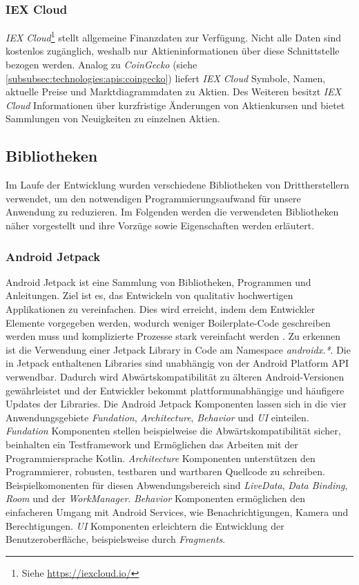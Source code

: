\documentclass[a4paper]{article}
\begin{document}
\subsubsection{IEX Cloud}
\label{subsubsec:technologies:apis:iex}
\textit{IEX Cloud}\footnote{Siehe \url{https://iexcloud.io/}} stellt allgemeine Finanzdaten zur Verfügung.
Nicht alle Daten sind kostenlos zugänglich, weshalb nur Aktieninformationen über diese Schnittstelle bezogen werden.
Analog zu \textit{CoinGecko} (siehe \autoref{subsubsec:technologies:apis:coingecko}) liefert \textit{IEX Cloud} Symbole, Namen, aktuelle Preise und Marktdiagrammdaten zu Aktien.
Des Weiteren besitzt \textit{IEX Cloud} Informationen über kurzfristige Änderungen von Aktienkursen und bietet Sammlungen von Neuigkeiten zu einzelnen Aktien.


\subsection{Bibliotheken}
\label{subsec:technologies:bibs}
Im Laufe der Entwicklung wurden verschiedene Bibliotheken von Drittherstellern verwendet, um den notwendigen Programmierungsaufwand für unsere Anwendung zu reduzieren.
Im Folgenden werden die verwendeten Bibliotheken näher vorgestellt und ihre Vorzüge sowie Eigenschaften werden erläutert.


\subsubsection{Android Jetpack}
\label{subsubsec:technologies:bibs:jetpack}
Android Jetpack ist eine Sammlung von Bibliotheken, Programmen und Anleitungen. Ziel ist es, das Entwickeln von qualitativ hochwertigen Applikationen zu vereinfachen. Dies wird erreicht, indem dem Entwickler Elemente vorgegeben werden, wodurch weniger Boilerplate-Code geschreiben werden muss und komplizierte Prozesse stark vereinfacht werden \cite{android_jetpack}. Zu erkennen ist die Verwendung einer Jetpack Library in Code am Namespace \textit{androidx.*}. Die in Jetpack enthaltenen Libraries sind unabhängig von der Android Platform API verwendbar. Dadurch wird Abwärtskompatibilität zu älteren Android-Versionen gewährleistet und der Entwickler bekommt plattformunabhängige und häufigere Updates der Libraries. Die Android Jetpack Komponenten lassen sich in die vier Anwendungsgebiete \textit{Fundation}, \textit{Architecture}, \textit{Behavior} und \textit{UI} einteilen. \textit{Fundation} Komponenten stellen beispielweise die Abwärtskompatibilität sicher, beinhalten ein Testframework und Ermöglichen das Arbeiten mit der Programmiersprache Kotlin. \textit{Architecture} Komponenten unterstützen den Programmierer, robusten, testbaren und wartbaren Quellcode zu schreiben. Beispielkomonenten für diesen Abwendungsbereich sind \textit{LiveData}, \textit{Data Binding}, \textit{Room} und der \textit{WorkManager}. \textit{Behavior} Komponenten ermöglichen den einfacheren Umgang mit Android Services, wie Benachrichtigungen, Kamera und Berechtigungen. \textit{UI} Komponenten erleichtern die Entwicklung der Benutzeroberfläche, beispielsweise durch \textit{Fragments}.
\end{document}

